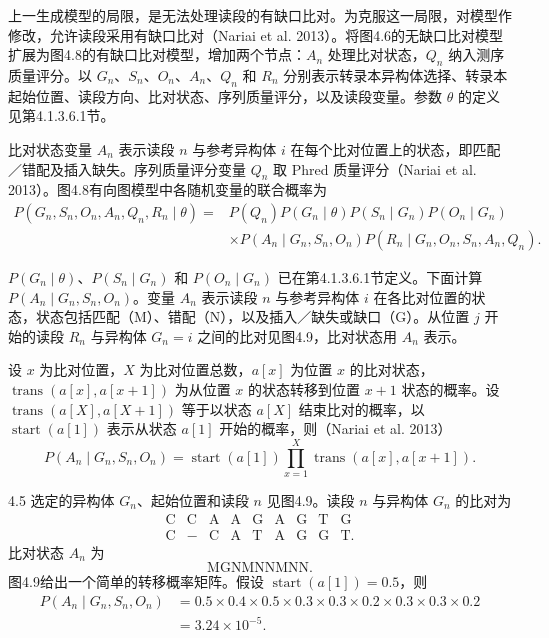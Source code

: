 上一生成模型的局限，是无法处理读段的有缺口比对。为克服这一局限，对模型作修改，允许读段采用有缺口比对（Nariai et al. 2013）。将图4.6的无缺口比对模型扩展为图4.8的有缺口比对模型，增加两个节点：$A_n$ 处理比对状态，$Q_n$ 纳入测序质量评分。以 $G_n$、$S_n$、$O_n$、$A_n$、$Q_n$ 和 $R_n$ 分别表示转录本异构体选择、转录本起始位置、读段方向、比对状态、序列质量评分，以及读段变量。参数 $\theta$ 的定义见第4.1.3.6.1节。

比对状态变量 $A_n$ 表示读段 $n$ 与参考异构体 $i$ 在每个比对位置上的状态，即匹配／错配及插入缺失。序列质量评分变量 $Q_n$ 取 Phred 质量评分（Nariai et al. 2013）。图4.8有向图模型中各随机变量的联合概率为
\begin{equation}
\begin{aligned}
P(G_n,S_n,O_n,A_n,Q_n,R_n\mid\theta)
={}&P(Q_n)P(G_n\mid\theta)P(S_n\mid G_n)P(O_n\mid G_n)\\
&\times P(A_n\mid G_n,S_n,O_n)P(R_n\mid G_n,O_n,S_n,A_n,Q_n).
\end{aligned}
\tag{4.22}
\end{equation}


$P(G_n\mid\theta)$、$P(S_n\mid G_n)$ 和 $P(O_n\mid G_n)$ 已在第4.1.3.6.1节定义。下面计算 $P(A_n\mid G_n,S_n,O_n)$。变量 $A_n$ 表示读段 $n$ 与参考异构体 $i$ 在各比对位置的状态，状态包括匹配（M）、错配（N），以及插入／缺失或缺口（G）。从位置 $j$ 开始的读段 $R_n$ 与异构体 $G_n=i$ 之间的比对见图4.9，比对状态用 $A_n$ 表示。

设 $x$ 为比对位置，$X$ 为比对位置总数，$a[x]$ 为位置 $x$ 的比对状态，$\operatorname{trans}(a[x],a[x+1])$ 为从位置 $x$ 的状态转移到位置 $x+1$ 状态的概率。设 $\operatorname{trans}(a[X],a[X+1])$ 等于以状态 $a[X]$ 结束比对的概率，以 $\operatorname{start}(a[1])$ 表示从状态 $a[1]$ 开始的概率，则（Nariai et al. 2013）
\begin{equation}
P(A_n\mid G_n,S_n,O_n)=\operatorname{start}(a[1])\prod_{x=1}^{X}\operatorname{trans}(a[x],a[x+1]).
\tag{4.23}
\end{equation}

\begin{bookexample}{4.5}
选定的异构体 $G_n$、起始位置和读段 $n$ 见图4.9。读段 $n$ 与异构体 $G_n$ 的比对为
\[
\begin{array}{ccccccccc}
\mathrm C&\mathrm C&\mathrm A&\mathrm A&\mathrm G&\mathrm A&\mathrm G&\mathrm T&\mathrm G\\
\mathrm C&-&\mathrm C&\mathrm A&\mathrm T&\mathrm A&\mathrm G&\mathrm G&\mathrm T.
\end{array}
\]
比对状态 $A_n$ 为
\[
\mathrm{MGNMNNMNN}.
\]
图4.9给出一个简单的转移概率矩阵。假设 $\operatorname{start}(a[1])=0.5$，则
\[
\begin{aligned}
P(A_n\mid G_n,S_n,O_n)
&=0.5\times0.4\times0.5\times0.3\times0.3\times0.2\times0.3\times0.3\times0.2\\
&=3.24\times10^{-5}.
\end{aligned}
\]
\end{bookexample}


